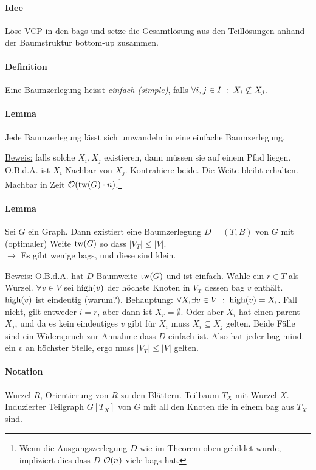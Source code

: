 \paragraph{Idee}
Löse VCP in den bags und setze die Gesamtlösung aus den Teillösungen anhand der Baumstruktur bottom-up zusammen.

\paragraph{Definition}
Eine Baumzerlegung heisst \emph{einfach (simple)}, falls $\forall i, j \in I \; : \; X_i \nsubseteq X_j$.

\paragraph{Lemma}
Jede Baumzerlegung lässt sich umwandeln in eine einfache Baumzerlegung.

\underline{Beweis:}
falls solche $X_i, X_j$ existieren, dann müssen sie auf einem Pfad liegen.
O.B.d.A. ist $X_i$ Nachbar von $X_j$. Kontrahiere beide.
Die Weite bleibt erhalten.
Machbar in Zeit $\mathcal{O}(\text{tw}(G) \cdot n)$.\footnote{Wenn die Ausgangszerlegung $D$ wie im Theorem oben gebildet wurde,
impliziert dies dass $D$ $\mathcal{O}(n)$ viele bags hat.}

\paragraph{Lemma}
Sei $G$ ein Graph.
Dann existiert eine Baumzerlegung $D=(T,B)$ von $G$ mit (optimaler) Weite $\text{tw}(G)$ so dass $|V_T| \leq |V|$. \\
$\longrightarrow$ Es gibt wenige bags, und diese sind klein.

\underline{Beweis:}
O.B.d.A. hat $D$ Baumweite $\text{tw}(G)$ und ist einfach. Wähle ein $r \in T$ als Wurzel.
$\forall v \in V$ sei $\text{high}(v)$ der höchste Knoten in $V_T$ dessen bag $v$ enthält.
$\text{high}(v)$ ist eindeutig (warum?).
Behauptung: $\forall X_i \exists v \in V \; : \; \text{high}(v) = X_i$.
Fall nicht, gilt entweder $i = r$, aber dann ist $X_r = \emptyset$.
Oder aber $X_i$ hat einen parent $X_j$, und da es kein eindeutiges $v$ gibt für $X_i$ muss $X_i \subseteq X_j$ gelten.
Beide Fälle sind ein Widerspruch zur Annahme dass $D$ einfach ist.
Also hat jeder bag mind. ein $v$ an höchster Stelle, ergo muss $|V_T| \leq |V|$ gelten.

\paragraph{Notation}
Wurzel $R$, Orientierung von $R$ zu den Blättern.
Teilbaum $T_X$ mit Wurzel $X$.
Induzierter Teilgraph $G[T_X]$ von $G$ mit all den Knoten die in einem bag aus $T_X$ sind.

